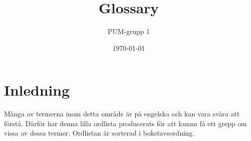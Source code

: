

\ifpdf
\else
\fi

\title{Glossary}
\author{PUM-grupp 1}
\date{\today}



\maketitle\thispagestyle{empty}

\newpage


\section{Inledning}

Många av termerna inom detta område är på engelska och kan vara svåra att förstå. Därför har denna lilla ordlista producerats för att kunna få ett grepp om vissa av dessa termer. Ordlistan är sorterad i bokstavsordning.

